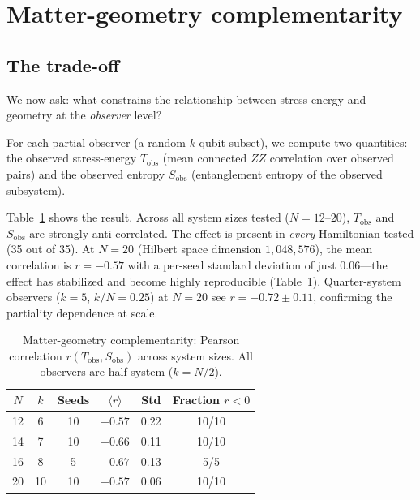 \documentclass[aps,pra,twocolumn,superscriptaddress,floatfix]{revtex4-2}
\begin{document}
\section{Matter-geometry complementarity}
\label{sec:complementarity}

\subsection{The trade-off}

We now ask: what constrains the relationship between
stress-energy and geometry at the \emph{observer} level?

For each partial observer (a random $k$-qubit subset),
we compute two quantities: the observed stress-energy
$T_\mathrm{obs}$ (mean connected $ZZ$ correlation over
observed pairs) and the observed entropy $S_\mathrm{obs}$
(entanglement entropy of the observed subsystem).

Table~\ref{tab:complementarity} shows the result.
Across all system sizes tested ($N = 12$--$20$),
$T_\mathrm{obs}$ and $S_\mathrm{obs}$ are strongly
anti-correlated.  The effect is present in \emph{every}
Hamiltonian tested (35 out of 35).  At $N = 20$
(Hilbert space dimension $1{,}048{,}576$), the mean
correlation is $r = -0.57$ with a per-seed standard
deviation of just $0.06$---the effect has stabilized
and become highly reproducible
(Table~\ref{tab:complementarity}).
Quarter-system observers ($k = 5$, $k/N = 0.25$) at
$N = 20$ see $r = -0.72 \pm 0.11$, confirming the
partiality dependence at scale.

\begin{table}[t]
\caption{Matter-geometry complementarity: Pearson correlation
$r(T_\mathrm{obs}, S_\mathrm{obs})$ across system sizes.
All observers are half-system ($k = N/2$).}
\label{tab:complementarity}
\begin{ruledtabular}
\begin{tabular}{cccccc}
$N$ & $k$ & Seeds & $\langle r \rangle$ & Std &
Fraction $r < 0$ \\
\hline
12 & 6  & 10 & $-0.57$ & 0.22 & 10/10 \\
14 & 7  & 10 & $-0.66$ & 0.11 & 10/10 \\
16 & 8  & 5  & $-0.67$ & 0.13 & 5/5 \\
20 & 10 & 10 & $-0.57$ & 0.06 & 10/10 \\
\end{tabular}
\end{ruledtabular}
\end{table}
\end{document}
